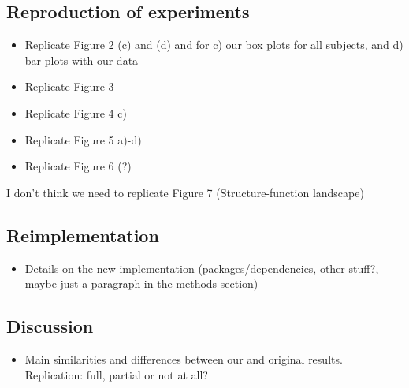 \subsection{Reproduction of experiments}

\begin{itemize}
 \item 
  Replicate Figure 2 (c) and (d) 
  and for c) our box plots for all subjects, and d) bar plots with our data
  
 \item
  Replicate Figure 3 

 \item
  Replicate Figure 4 c) 
  
 \item
  Replicate Figure 5 a)-d)
  
 \item
  Replicate Figure 6 (?)
\end{itemize}

I don't think we need to replicate Figure 7 (Structure-function landscape)

\subsection{Reimplementation}

\begin{itemize}
 \item 
  Details on the new implementation (packages/dependencies, other stuff?, maybe just a paragraph in the methods section) 
\end{itemize}

 




\subsection{Discussion}

\begin{itemize}
 \item 
  Main similarities and differences between our and original results. Replication: full, partial or not at all?
\end{itemize}
